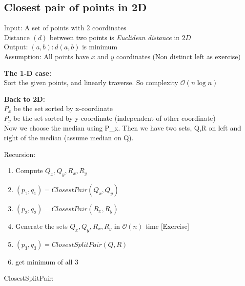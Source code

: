 \documentclass[a4paper
]{article}
\providecommand{\tightlist}{%
  \setlength{\itemsep}{0pt}\setlength{\parskip}{0pt}}
\begin{document}
\hypertarget{closest-pair-of-points-in-2d}{%
\subsection{Closest pair of points in
2D}\label{closest-pair-of-points-in-2d}}

Input: A set of points with {\(2\)} coordinates\\
Distance {\((d)\)} between two points is \emph{Euclidean distance} in
{\(2D\)}\\
Output: {\((a,b):d(a,b)\)} is minimum\\
Assumption: All points have {\(x\)} and {\(y\)} coordinates (Non
distinct left as exercise)

\textbf{The 1-D case:}\\
Sort the given points, and linearly traverse. So complexity
{\(\mathcal{O}(n\log n)\)}

\textbf{Back to 2D:}\\
{\(P_{x}\)} be the set sorted by x-coordinate\\
{\(P_{y}\)} be the set sorted by y-coordinate (independent of other
coordinate)\\
Now we choose the median using P\_x. Then we have two sets, Q,R on left
and right of the median (assume median on Q).

Recursion:

\begin{enumerate}
\tightlist
\item
  Compute {\(Q_{x},Q_{y},R_{x},R_{y}\)}
\item
  {\((p_{1},q_{1}) = {ClosestPair}(Q_{x},Q_{y})\)}
\item
  {\((p_{2},q_{2}) = {ClosestPair}(R_{x},R_{y})\)}
\item
  Generate the sets {\(Q_{x},Q_{y},R_{x},R_{y}\)} in
  {\(\mathcal{O}(n)\)} time {[}Exercise{]}
\item
  {\((p_{3},q_{3}) = {ClosestSplitPair}(Q,R)\)}
\item
  get minimum of all {\(3\)}
\end{enumerate}

ClosestSplitPair:
\end{document}
